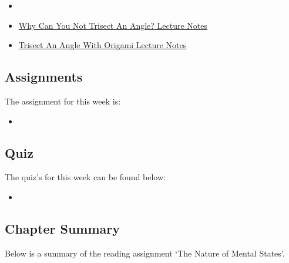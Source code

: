 \begin{itemize}
    \item {}
    \item \href{https://www.youtube.com/watch?v=6Lm9EHhbJAY}{Why Can You Not Trisect An Angle? Lecture Notes}
    \item \href{https://www.youtube.com/watch?v=SL2lYcggGpc}{Trisect An Angle With Origami Lecture Notes}
\end{itemize}

\subsection{Assignments}

The assignment for this week is:

\begin{itemize}
    \item {}
\end{itemize}

\subsection{Quiz}

The quiz's for this week can be found below:

\begin{itemize}
    \item {}
\end{itemize}

\subsection{Chapter Summary}

Below is a summary of the reading assignment `The Nature of Mental States'.


